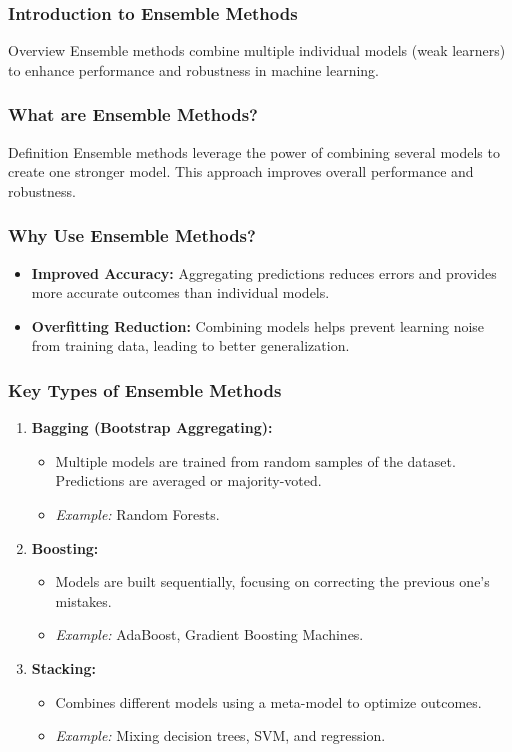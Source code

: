 \documentclass[aspectratio=169]{beamer}
\begin{document}
\frame{\titlepage}

\begin{frame}[fragile]
    \frametitle{Introduction to Ensemble Methods}
    \begin{block}{Overview}
        Ensemble methods combine multiple individual models (weak learners) to enhance performance and robustness in machine learning.
    \end{block}
\end{frame}

\begin{frame}[fragile]
    \frametitle{What are Ensemble Methods?}
    \begin{block}{Definition}
        Ensemble methods leverage the power of combining several models to create one stronger model. This approach improves overall performance and robustness.
    \end{block}
\end{frame}

\begin{frame}[fragile]
    \frametitle{Why Use Ensemble Methods?}
    \begin{itemize}
        \item \textbf{Improved Accuracy:} Aggregating predictions reduces errors and provides more accurate outcomes than individual models.
        \item \textbf{Overfitting Reduction:} Combining models helps prevent learning noise from training data, leading to better generalization.
    \end{itemize}
\end{frame}

\begin{frame}[fragile]
    \frametitle{Key Types of Ensemble Methods}
    \begin{enumerate}
        \item \textbf{Bagging (Bootstrap Aggregating):}
        \begin{itemize}
            \item Multiple models are trained from random samples of the dataset. Predictions are averaged or majority-voted.
            \item \textit{Example:} Random Forests.
        \end{itemize}
        \item \textbf{Boosting:}
        \begin{itemize}
            \item Models are built sequentially, focusing on correcting the previous one's mistakes.
            \item \textit{Example:} AdaBoost, Gradient Boosting Machines.
        \end{itemize}
        \item \textbf{Stacking:}
        \begin{itemize}
            \item Combines different models using a meta-model to optimize outcomes.
            \item \textit{Example:} Mixing decision trees, SVM, and regression.
        \end{itemize}
    \end{enumerate}
\end{frame}
\end{document}

